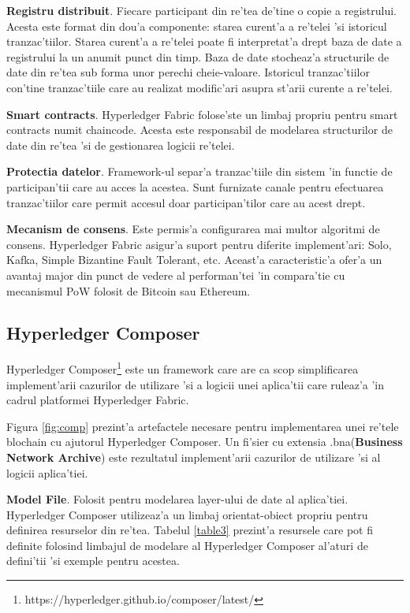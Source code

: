 \documentclass[12pt,a4paper,twoside]{report}
\begin{document}
\textbf{Registru distribuit}. Fiecare participant din re'tea de'tine o copie a registrului. Acesta este format din dou'a componente: starea curent'a a re'telei 'si istoricul tranzac'tiilor. Starea curent'a a re'telei poate fi interpretat'a drept baza de date a registrului la un anumit punct din timp. Baza de date stocheaz'a structurile de date din re'tea sub forma unor perechi cheie-valoare. Istoricul tranzac'tiilor con'tine tranzac'tiile care au realizat modific'ari asupra st'arii curente a re'telei. 

\textbf{Smart contracts}. Hyperledger Fabric folose'ste un limbaj propriu pentru smart contracts numit chaincode. Acesta este responsabil de modelarea structurilor de date din re'tea 'si de gestionarea logicii re'telei.

\textbf{Protectia datelor}. Framework-ul separ'a tranzac'tiile din sistem 'in functie de participan'tii care au acces la acestea. Sunt furnizate canale pentru efectuarea tranzac'tiilor care permit accesul doar participan'tilor care au acest drept.

\textbf{Mecanism de consens}. Este permis'a configurarea mai multor algoritmi de consens. Hyperledger Fabric asigur'a suport pentru diferite implement'ari: Solo, Kafka, Simple Bizantine Fault Tolerant, etc\cite{fabricdoc}. Aceast'a caracteristic'a ofer'a un avantaj major din punct de vedere al performan'tei 'in compara'tie cu mecanismul PoW folosit de Bitcoin sau Ethereum.

\subsection{Hyperledger Composer}\label{sssec:num1}
Hyperledger Composer\footnote{https://hyperledger.github.io/composer/latest/} este un framework care are ca scop simplificarea implement'arii cazurilor de utilizare 'si a logicii unei aplica'tii care ruleaz'a 'in cadrul platformei Hyperledger Fabric.

Figura \ref{fig:comp} prezint'a artefactele necesare pentru implementarea unei re'tele blochain cu ajutorul Hyperledger Composer. Un fi'sier cu extensia .bna(\textbf{Business Network Archive}) este rezultatul implement'arii cazurilor de utilizare 'si al logicii aplica'tiei.

\textbf{Model File}. Folosit pentru modelarea layer-ului de date al aplica'tiei. Hyperledger Composer utilizeaz'a un limbaj orientat-obiect propriu pentru definirea resurselor din re'tea. Tabelul \ref{table3} prezint'a resursele care pot fi definite folosind limbajul de modelare al Hyperledger Composer al'aturi de defini'tii 'si exemple pentru acestea.
\end{document}
